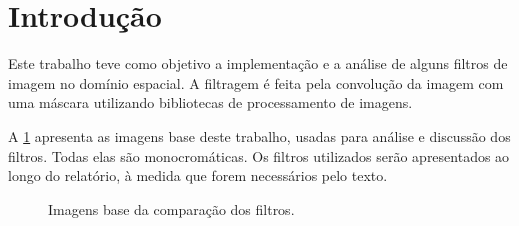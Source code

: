 \section{Introdução}

Este trabalho teve como objetivo a implementação e a análise de alguns filtros de imagem no domínio espacial. A filtragem é feita pela convolução da imagem com uma máscara utilizando bibliotecas de processamento de imagens.

A \cref{fig:base} apresenta as imagens base deste trabalho, usadas para análise e discussão dos filtros. Todas elas são monocromáticas. Os filtros utilizados serão apresentados ao longo do relatório, à medida que forem necessários pelo texto.

\begin{figure}[H]
    \centering
    

    \caption{Imagens base da comparação dos filtros.}
    \label{fig:base}
\end{figure}
